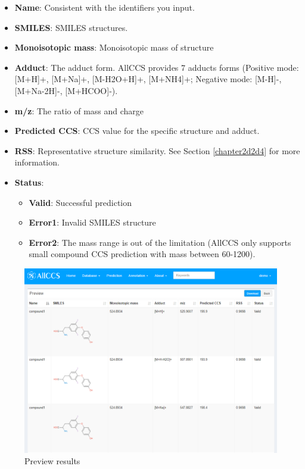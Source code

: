 \documentclass[12pt,]{book}
\providecommand{\tightlist}{%
  \setlength{\itemsep}{0pt}\setlength{\parskip}{0pt}}
\begin{document}
\begin{itemize}
\tightlist
\item
  \textbf{Name}: Consistent with the identifiers you input.
\item
  \textbf{SMILES}: SMILES structures.
\item
  \textbf{Monoisotopic mass}: Monoisotopic mass of structure
\item
  \textbf{Adduct}: The adduct form. AllCCS provides 7 adducts forms
  (Positive mode: {[}M+H{]}+, {[}M+Na{]}+, {[}M-H2O+H{]}+, {[}M+NH4{]}+;
  Negative mode: {[}M-H{]}-, {[}M+Na-2H{]}-, {[}M+HCOO{]}-).
\item
  \textbf{m/z}: The ratio of mass and charge
\item
  \textbf{Predicted CCS}: CCS value for the specific structure and
  adduct.
\item
  \textbf{RSS}: Representative structure similarity. See Section
  \ref{chapter2d2d4} for more information.
\item
  \textbf{Status}:

  \begin{itemize}
  \tightlist
  \item
    \textbf{Valid}: Successful prediction
  \item
    \textbf{Error1}: Invalid SMILES structure
  \item
    \textbf{Error2}: The mass range is out of the limitation (AllCCS
    only supports small compound CCS prediction with mass between
    60-1200).
  \end{itemize}
\end{itemize}

\begin{figure}

{\centering \includegraphics{images/chapter3/figure3.3preview_result} 

}

\caption{Preview results}\label{fig:figure3d3}
\end{figure}
\end{document}
